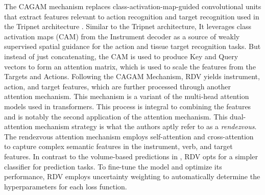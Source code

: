 The CAGAM mechanism replaces class-activation-map-guided convolutional units that extract features relevant to action recognition and target recognition used in the Tripnet architecture \citep{1nywoye_rec_action_triplets}. Similar to the Tripnet architecture, It leverages class activation maps (CAM) from the Instrument decoder as a source of weakly supervised spatial guidance for the action and tissue target recognition tasks. But instead of just concatenating, the CAM is used to produce Key and Query vectors to form an attention matrix, which is used to scale the features from the Targets and Actions. 
Following the CAGAM Mechanism, RDV yields instrument, action, and target features, which are further processed through another attention mechanism. This mechanism is a variant of the multi-head attention models used in transformers. This process is integral to combining the features and is notably the second application of the attention mechanism. This dual-attention mechanism strategy is what the authors aptly refer to as a \emph{rendezvous}. The rendezvous attention mechanism employs self-attention and cross-attention to capture complex semantic features in the instrument, verb, and target features.
In contrast to the volume-based predictions in \citet{1nywoye_rec_action_triplets}, RDV opts for a simpler classifier for prediction tasks. To fine-tune the model and optimize its performance, RDV employs uncertainty weighting \citep{uncertainty_weighting} to automatically determine the hyperparameters for each loss function. 

 

\begin{table}[htb!]
\caption{Results of methods on the CholecT45 dataset. Results should be compared with caution as each reported work sometimes reported a different training/testing split. The mean of the published results are reported.} \label{triplet_results:table}
\end{table}

